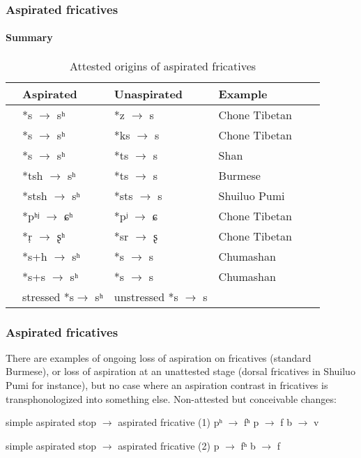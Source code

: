\documentclass[xcolor=table]{beamer}
\begin{document}
  \begin{frame} 
\frametitle{Aspirated fricatives} 
 \framesubtitle{Summary}

\begin{table}[h]
\caption{Attested origins of aspirated fricatives}
\begin{tabular}{llllll}
\toprule
&Aspirated & Unaspirated & Example \\
\midrule
& *s $\rightarrow$ sʰ &*z $\rightarrow$ s & Chone Tibetan\\
& *s $\rightarrow$ sʰ &*ks $\rightarrow$ s & Chone Tibetan\\
& *s $\rightarrow$ sʰ &*ts $\rightarrow$ s & Shan \\
\midrule
& *tsh $\rightarrow$ sʰ &*ts $\rightarrow$ s &Burmese \\
& *stsh $\rightarrow$ sʰ &*sts $\rightarrow$ s &Shuiluo Pumi \\
& *pʰʲ $\rightarrow$ ɕʰ &*pʲ $\rightarrow$ ɕ & Chone Tibetan \\
\midrule
& *ṛ $\rightarrow$ ʂʰ &*sr $\rightarrow$ ʂ & Chone Tibetan \\
\midrule
& *s+h $\rightarrow$ sʰ &*s $\rightarrow$ s & Chumashan \\
& *s+s $\rightarrow$ sʰ &*s $\rightarrow$ s & Chumashan \\
\midrule
& stressed *s$\rightarrow$ sʰ &unstressed *s $\rightarrow$ s &  \\
\bottomrule
\end{tabular}
\end{table}


   \end{frame}  

  \begin{frame} 
\frametitle{Aspirated fricatives} 


There are examples of ongoing loss of aspiration on fricatives (standard Burmese), or loss of aspiration at an unattested stage (dorsal fricatives in Shuiluo Pumi for instance), but no case where an aspiration contrast in fricatives is transphonologized into something else.
Non-attested but conceivable changes:
\begin{exe}
\ex 
\glt simple aspirated stop $\rightarrow$ aspirated fricative (1)
\glt *pʰ $\rightarrow$ fʰ
\glt *p $\rightarrow$ f
\glt *b $\rightarrow$ v
\end{exe}

\begin{exe}
\ex 
\glt simple aspirated stop $\rightarrow$ aspirated fricative (2)
\glt *p $\rightarrow$ fʰ
\glt *b $\rightarrow$ f
\end{exe}


   \end{frame}    
 
\end{document}
